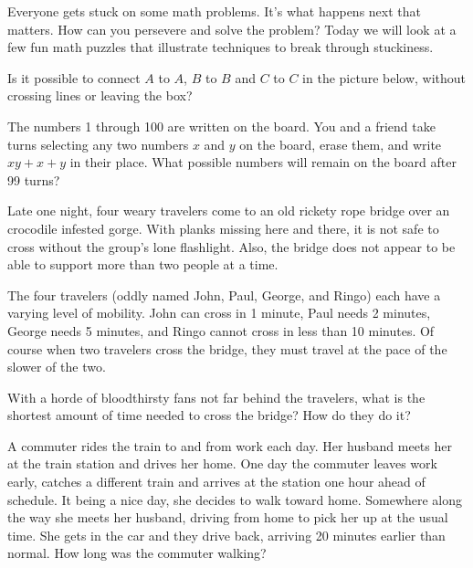 \documentclass[11pt]{exam}
\begin{document}
Everyone gets stuck on some math problems.  It's what happens next that matters.  How can you persevere and solve the problem?  Today we will look at a few fun math puzzles that illustrate techniques to break through stuckiness.

\begin{questions}
  \question Is it possible to connect $A$ to $A$, $B$ to $B$ and $C$ to $C$ in the picture below, without crossing lines or leaving the box?

  \begin{center}
  \end{center}

  \question The numbers 1 through 100 are written on the board.  You and a friend take turns selecting any two numbers $x$ and $y$ on the board, erase them, and write $xy + x + y$ in their place.  What possible numbers will remain on the board after 99 turns?

  \question Late one night, four weary travelers come to an old rickety rope bridge over an crocodile infested gorge. With planks missing here and there, it is not safe to cross without the group's lone flashlight. Also, the bridge does not appear to be able to support more than two people at a time.

The four travelers (oddly named John, Paul, George, and Ringo) each have a varying level of mobility. John can cross in 1 minute, Paul needs 2 minutes, George needs 5 minutes, and Ringo cannot cross in less than 10 minutes. Of course when two travelers cross the bridge, they must travel at the pace of the slower of the two.

With a horde of bloodthirsty fans not far behind the travelers, what is the shortest amount of time needed to cross the bridge? How do they do it?


\question A commuter rides the train to and from work each day. Her husband meets her at the train station and drives her home. One day the commuter leaves work early, catches a different train and arrives at the station one hour ahead of schedule. It being a nice day, she decides to walk toward home. Somewhere along the way she meets her husband, driving from home to pick her up at the usual time. She gets in the car and they drive back, arriving 20 minutes earlier than normal. How long was the commuter walking?


\end{questions}
\end{document}
